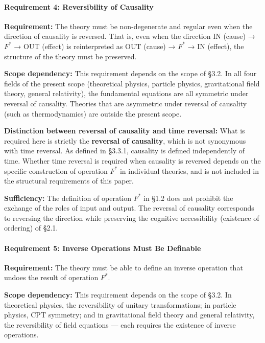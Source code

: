 \documentclass[a4paper,11pt]{article}
\begin{document}
\paragraph{Requirement 4: Reversibility of
Causality}\label{requirement-4-reversibility-of-causality}

\textbf{Requirement:} The theory must be non-degenerate and regular even
when the direction of causality is reversed. That is, even when the
direction \(\mathrm{IN}\) (cause) → \(F^*\) → \(\mathrm{OUT}\) (effect)
is reinterpreted as \(\mathrm{OUT}\) (cause) → \(F^*\) → \(\mathrm{IN}\)
(effect), the structure of the theory must be preserved.

\textbf{Scope dependency:} This requirement depends on the scope of
§3.2. In all four fields of the present scope (theoretical physics,
particle physics, gravitational field theory, general relativity), the
fundamental equations are all symmetric under reversal of causality.
Theories that are asymmetric under reversal of causality (such as
thermodynamics) are outside the present scope.

\textbf{Distinction between reversal of causality and time reversal:}
What is required here is strictly the \textbf{reversal of causality},
which is not synonymous with time reversal. As defined in §3.3.1,
causality is defined independently of time. Whether time reversal is
required when causality is reversed depends on the specific construction
of operation \(F^*\) in individual theories, and is not included in the
structural requirements of this paper.

\textbf{Sufficiency:} The definition of operation \(F^*\) in §1.2 does
not prohibit the exchange of the roles of input and output. The reversal
of causality corresponds to reversing the direction while preserving the
cognitive accessibility (existence of ordering) of §2.1.

\paragraph{Requirement 5: Inverse Operations Must Be
Definable}\label{requirement-5-inverse-operations-must-be-definable}

\textbf{Requirement:} The theory must be able to define an inverse
operation that undoes the result of operation \(F^*\).

\textbf{Scope dependency:} This requirement depends on the scope of
§3.2. In theoretical physics, the reversibility of unitary
transformations; in particle physics, CPT symmetry; and in gravitational
field theory and general relativity, the reversibility of field
equations --- each requires the existence of inverse operations.
\end{document}
